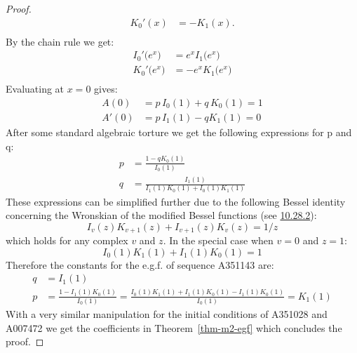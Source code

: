 \documentclass[a4paper]{amsart}
\begin{document}
\begin{proof}
\begin{equation}
\begin{aligned}
K_0'(x) &= -K_1(x). \\
\end{aligned}
\end{equation}
By the chain rule we get:
\begin{equation*}
    \begin{aligned}
        I_0'\bigl(e^x\bigr) &= e^xI_1\bigl(e^x\bigr) \\
        K_0'\bigl(e^x\bigr) &= -e^xK_1\bigl(e^x\bigr) \\
    \end{aligned}
\end{equation*}
Evaluating at $x=0$ gives:
\[
\begin{aligned}
A(0) & = p \,I_0(1)+q\,K_0(1) = 1 \\
A'(0) & = p\,I_1(1)-q K_1(1) = 0
\end{aligned}
\]
After some standard algebraic torture we get the following expressions for p and q:
\[
\begin{aligned}
p &= \frac{1-qK_0(1)}{I_0(1)} \\
q &= \frac{I_1(1)}{I_1(1)K_0(1)+I_0(1)K_1(1)}
\end{aligned}
\]
These expressions can be simplified further due to the following Bessel identity concerning the Wronskian of the modified Bessel functions (see \href{https://dlmf.nist.gov/10.28.E2}{10.28.2}):
\begin{equation}\label{eq-bessel-wronskian-general}
    I_v(z)K_{v+1}(z)+I_{v+1}(z)K_v(z) = 1/z
\end{equation}
which holds for any complex $v$ and $z$. In the special case when $v = 0$ and $z=1$:
\begin{equation}\label{eq-bessel-wronskian}
I_0(1)K_1(1)+I_1(1)K_0(1) = 1
\end{equation}
Therefore the constants for the e.g.f. of sequence A351143 are:
\[
\begin{aligned}
q &= I_1(1) \\
p &= \frac{1 - I_1(1)K_0(1)}{I_0(1)} = \frac{I_0(1)K_1(1)+I_1(1)K_0(1) - I_1(1)K_0(1)}{I_0(1)} = K_1(1)
\end{aligned}
\]
With a very similar manipulation for the initial conditions of A351028 and A007472 we get the coefficients in Theorem~\ref{thm-m2-egf} which concludes the proof.
\end{proof}
\end{document}
